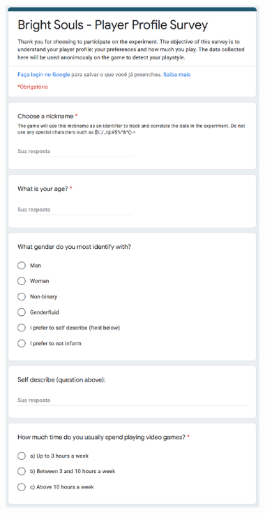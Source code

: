 \begin{figure}[!ht]
    \begin{center}
        \includegraphics[width=26em]{figures/fig-player-profile-survey-pt1.png}
    \end{center}
\end{figure}

